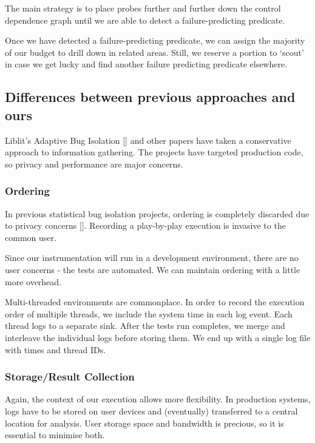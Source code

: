 The main strategy is to place probes further and further down the control dependence graph until we are able to detect a failure-predicting predicate.

Once we have detected a failure-predicting predicate, we can assign the majority of our budget to drill down in related areas. Still, we reserve a portion to ‘scout’ in case we get lucky and find another failure predicting predicate elsewhere.


\subsection{Differences between previous approaches and ours}

Liblit’s Adaptive Bug Isolation [] and other papers have taken a conservative approach to information gathering. The projects have targeted production code, so privacy and performance are major concerns.



\subsubsection{Ordering}

In previous statistical bug isolation projects, ordering is completely discarded due to privacy concerns []. Recording a play-by-play execution is invasive to the common user.

Since our instrumentation will run in a development environment, there are no user concerns - the tests are automated. We can maintain ordering with a little more overhead.

Multi-threaded environments are commonplace. In order to record the execution order of multiple threads, we include the system time in each log event. Each thread logs to a separate sink. After the tests run completes, we merge and interleave the individual logs before storing them. We end up with a single log file with times and thread IDs.


\subsubsection{Storage/Result Collection}

Again, the context of our execution allows more flexibility. In production systems, logs have to be stored on user devices and (eventually) transferred to a central location for analysis. User storage space and bandwidth is precious, so it is essential to minimise both.

